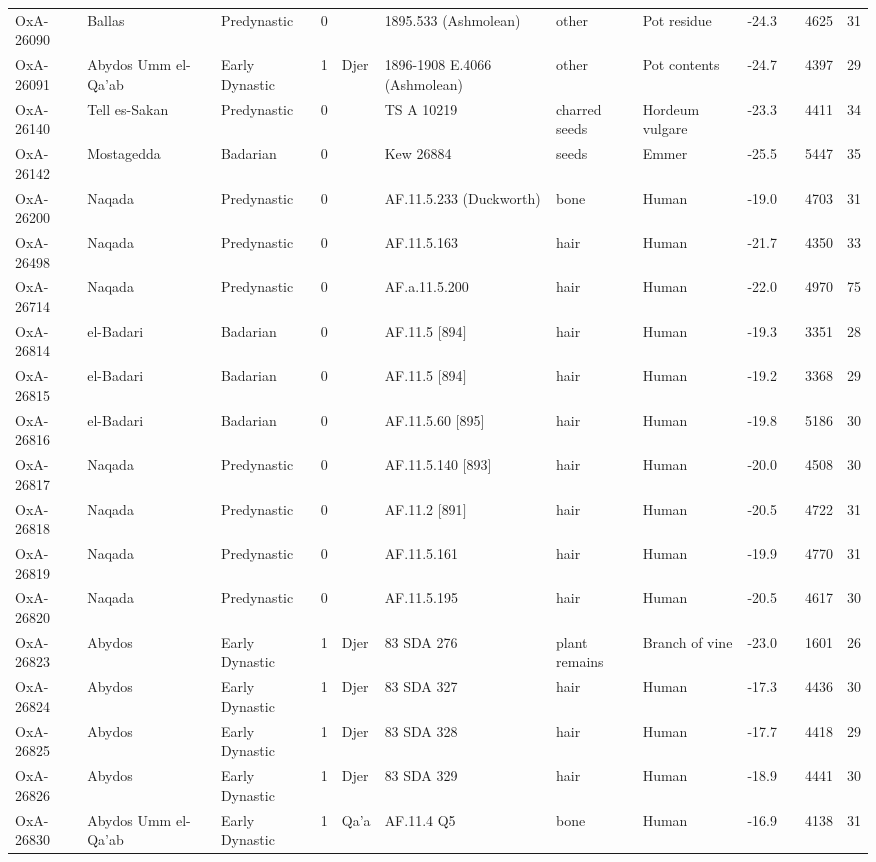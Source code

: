 \documentclass[a4paper,8pt]{article}
\begin{document}
\begin{landscape}
\begin{center}
\begin{longtable}{|l|>{\raggedright}p{20ex}|l|r|l|>{\raggedright}p{25ex}|l|l|r|l|r|r|}
OxA-26090 & Ballas & Predynastic & 0 &  & 1895.533 (Ashmolean) & other & Pot residue & -24.3 &  & 4625 & 31\\
OxA-26091 & Abydos Umm el-Qa'ab & Early Dynastic & 1 & Djer & 1896-1908 E.4066 (Ashmolean) & other & Pot contents & -24.7 &  & 4397 & 29\\
OxA-26140 & Tell es-Sakan & Predynastic & 0 &  & TS A 10219 & charred seeds & Hordeum vulgare & -23.3 &  & 4411 & 34\\
OxA-26142 & Mostagedda & Badarian & 0 &  & Kew 26884 & seeds & Emmer  & -25.5 &  & 5447 & 35\\
OxA-26200 & Naqada & Predynastic & 0 &  & AF.11.5.233 (Duckworth) & bone & Human & -19.0 &  & 4703 & 31\\
OxA-26498 & Naqada & Predynastic & 0 &  & AF.11.5.163 & hair & Human & -21.7 &  & 4350 & 33\\
OxA-26714 & Naqada & Predynastic & 0 &  & AF.a.11.5.200 & hair & Human & -22.0 &  & 4970 & 75\\
OxA-26814 & el-Badari & Badarian & 0 &  & AF.11.5 $[$894$]$ & hair & Human & -19.3 &  & 3351 & 28\\
OxA-26815 & el-Badari & Badarian & 0 &  & AF.11.5 $[$894$]$ & hair & Human & -19.2 &  & 3368 & 29\\
OxA-26816 & el-Badari & Badarian & 0 &  & AF.11.5.60 $[$895$]$ & hair & Human & -19.8 &  & 5186 & 30\\
OxA-26817 & Naqada & Predynastic & 0 &  & AF.11.5.140 $[$893$]$ & hair & Human & -20.0 &  & 4508 & 30\\
OxA-26818 & Naqada & Predynastic & 0 &  & AF.11.2 $[$891$]$ & hair & Human & -20.5 &  & 4722 & 31\\
OxA-26819 & Naqada & Predynastic & 0 &  & AF.11.5.161 & hair & Human & -19.9 &  & 4770 & 31\\
OxA-26820 & Naqada & Predynastic & 0 &  & AF.11.5.195 & hair & Human & -20.5 &  & 4617 & 30\\
OxA-26823 & Abydos & Early Dynastic & 1 & Djer & 83 SDA 276 & plant remains & Branch of vine & -23.0 &  & 1601 & 26\\
OxA-26824 & Abydos & Early Dynastic & 1 & Djer & 83 SDA 327 & hair & Human & -17.3 &  & 4436 & 30\\
OxA-26825 & Abydos & Early Dynastic & 1 & Djer & 83 SDA 328 & hair & Human & -17.7 &  & 4418 & 29\\
OxA-26826 & Abydos & Early Dynastic & 1 & Djer & 83 SDA 329 & hair & Human & -18.9 &  & 4441 & 30\\
OxA-26830 & Abydos Umm el-Qa'ab & Early Dynastic & 1 & Qa'a & AF.11.4 Q5 & bone & Human & -16.9 &  & 4138 & 31\\

\end{longtable}
\end{center}
\end{landscape}
\end{document}
